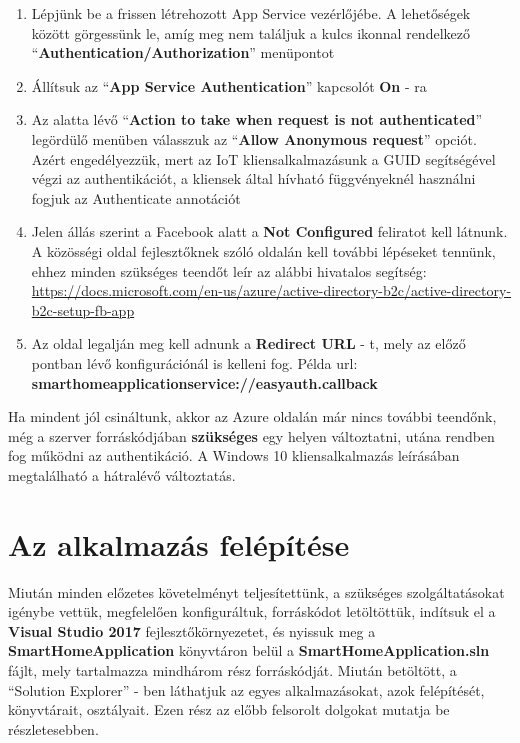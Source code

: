 \documentclass[a4paper,12pt]{report}
\begin{document}
\begin{enumerate}
    \item Lépjünk be a frissen létrehozott App Service vezérlőjébe. A lehetőségek között görgessünk le, amíg meg nem találjuk
    a kulcs ikonnal rendelkező \\ ``\textbf{Authentication/Authorization}'' menüpontot
    \item Állítsuk az ``\textbf{App Service Authentication}'' kapcsolót \textbf{On} - ra
    \item Az alatta lévő ``\textbf{Action to take when request is not authenticated}'' legördülő menüben válasszuk az
    ``\textbf{Allow Anonymous request}'' opciót. Azért engedélyezzük, mert az IoT kliensalkalmazásunk a GUID segítségével
    végzi az authentikációt, a kliensek által hívható függvényeknél használni fogjuk az Authenticate annotációt
    \item Jelen állás szerint a Facebook alatt a \textbf{Not Configured} feliratot kell látnunk. A közösségi oldal fejlesztőknek
    szóló oldalán kell további lépéseket tennünk, ehhez minden szükséges teendőt leír az alábbi hivatalos segítség:
    \url{https://docs.microsoft.com/en-us/azure/active-directory-b2c/active-directory-b2c-setup-fb-app}
    \item Az oldal legalján meg kell adnunk a \textbf{Redirect URL} - t, mely az előző pontban lévő konfigurációnál is kelleni fog.
    Példa url: \textbf{smarthomeapplicationservice://easyauth.callback}
\end{enumerate}

    Ha mindent jól csináltunk, akkor az Azure oldalán már nincs további teendőnk, még a szerver forráskódjában \textbf{szükséges}
    egy helyen változtatni, utána rendben fog működni az authentikáció. A Windows 10 kliensalkalmazás leírásában megtalálható a hátralévő változtatás.

\section{Az alkalmazás felépítése}
    Miután minden előzetes követelményt teljesítettünk, a szükséges szolgáltatásokat igénybe vettük, megfelelően konfiguráltuk,
    forráskódot letöltöttük, indítsuk el a \textbf{Visual Studio 2017} fejlesztőkörnyezetet, és nyissuk meg a \textbf{SmartHomeApplication}
    könyvtáron belül a \textbf{SmartHomeApplication.sln} fájlt, mely tartalmazza mindhárom rész forráskódját. Miután betöltött, a ``Solution Explorer'' - ben
    láthatjuk az egyes alkalmazásokat, azok felépítését, könyvtárait, osztályait. Ezen rész az előbb felsorolt dolgokat mutatja be
    részletesebben.
\end{document}
